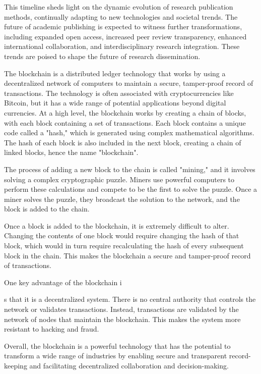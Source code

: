 \documentclass[lettersize,journal]{IEEEtran}
\begin{document}
This timeline sheds light on the dynamic evolution of research publication methods, continually adapting to new technologies and societal trends. The future of academic publishing is expected to witness further transformations, including expanded open access, increased peer review transparency, enhanced international collaboration, and interdisciplinary research integration. These trends are poised to shape the future of research dissemination.

The blockchain is a distributed ledger technology that works by using a decentralized network of computers to maintain a secure, tamper-proof record of transactions. The technology is often associated with cryptocurrencies like Bitcoin, but it has a wide range of potential applications beyond digital currencies.
At a high level, the blockchain works by creating a chain of blocks, with each block containing a set of transactions. Each block contains a unique code called a "hash," which is generated using complex mathematical algorithms. The hash of each block is also included in the next block, creating a chain of linked blocks, hence the name "blockchain".

The process of adding a new block to the chain is called "mining," and it involves solving a complex cryptographic puzzle. Miners use powerful computers to perform these calculations and compete to be the first to solve the puzzle. Once a miner solves the puzzle, they broadcast the solution to the network, and the block is added to the chain.

Once a block is added to the blockchain, it is extremely difficult to alter. Changing the contents of one block would require changing the hash of that block, which would in turn require recalculating the hash of every subsequent block in the chain. This makes the blockchain a secure and tamper-proof record of transactions.

One key advantage of the blockchain i

s that it is a decentralized system. There is no central authority that controls the network or validates transactions. Instead, transactions are validated by the network of nodes that maintain the blockchain. This makes the system more resistant to hacking and fraud.

Overall, the blockchain is a powerful technology that has the potential to transform a wide range of industries by enabling secure and transparent record-keeping and facilitating decentralized collaboration and decision-making.
\end{document}
